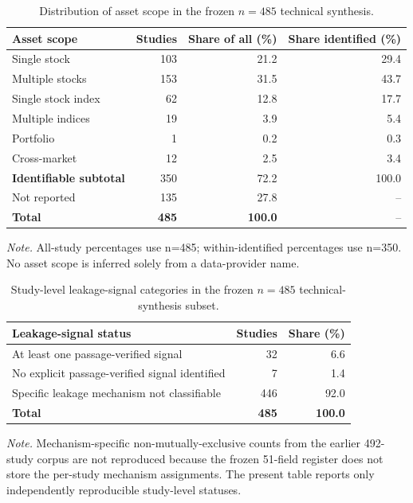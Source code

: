 \documentclass[12pt]{article}
\numberwithin{equation}{section}
\begin{document}
\begin{table}[!htbp]
\centering
\caption{Distribution of asset scope in the frozen $n=485$ technical synthesis.}
\label{tab:supp-asset-scope}
\small
\setlength{\tabcolsep}{4pt}
\renewcommand{\arraystretch}{1.12}
\begin{tabular}{lrrr}
\toprule
Asset scope & Studies & Share of all (\%) & Share identified (\%) \\
\midrule
Single stock & 103 & 21.2 & 29.4 \\
Multiple stocks & 153 & 31.5 & 43.7 \\
Single stock index & 62 & 12.8 & 17.7 \\
Multiple indices & 19 & 3.9 & 5.4 \\
Portfolio & 1 & 0.2 & 0.3 \\
Cross-market & 12 & 2.5 & 3.4 \\
\textbf{Identifiable subtotal} & 350 & 72.2 & 100.0 \\
Not reported & 135 & 27.8 & -- \\
\textbf{Total} & \textbf{485} & \textbf{100.0} & -- \\
\bottomrule
\end{tabular}

\vspace{1mm}
\begin{minipage}{0.97\linewidth}
\footnotesize
\textit{Note.} All-study percentages use n=485; within-identified percentages use n=350. No asset scope is inferred solely from a data-provider name.
\end{minipage}
\end{table}


\begin{table}[!htbp]
\centering
\caption{Study-level leakage-signal categories in the frozen $n=485$ technical-synthesis subset.}
\label{tab:supp-leakage-mechanisms}
\small
\setlength{\tabcolsep}{4pt}
\renewcommand{\arraystretch}{1.12}
\begin{tabular}{lrr}
\toprule
Leakage-signal status & Studies & Share (\%) \\
\midrule
At least one passage-verified signal & 32 & 6.6 \\
No explicit passage-verified signal identified & 7 & 1.4 \\
Specific leakage mechanism not classifiable & 446 & 92.0 \\
\textbf{Total} & \textbf{485} & \textbf{100.0} \\
\bottomrule
\end{tabular}

\vspace{1mm}
\begin{minipage}{0.97\linewidth}
\footnotesize
\textit{Note.} Mechanism-specific non-mutually-exclusive counts from the earlier 492-study corpus are not reproduced because the frozen 51-field register does not store the per-study mechanism assignments. The present table reports only independently reproducible study-level statuses.
\end{minipage}
\end{table}
\end{document}
